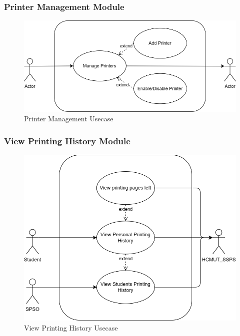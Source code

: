 \subsubsection{Printer Management Module}
\begin{figure}[htbp]
	\centering
	\includegraphics[width=1.0\textwidth]{Images/Usecases/Printer_Management_usecase.png}
	\vspace{15pt}
	\caption{\fontsize{12pt}{0pt}\selectfont Printer Management Usecase}
\end{figure}
\newpage

\subsubsection{View Printing History Module}
\begin{figure}[htbp]
	\centering
	\includegraphics[width=1.0\textwidth]{Images/Usecases/Printing_History_usecase.png}
	\vspace{15pt}
	\caption{\fontsize{12pt}{0pt}\selectfont View Printing History Usecase}
\end{figure}
\newpage

